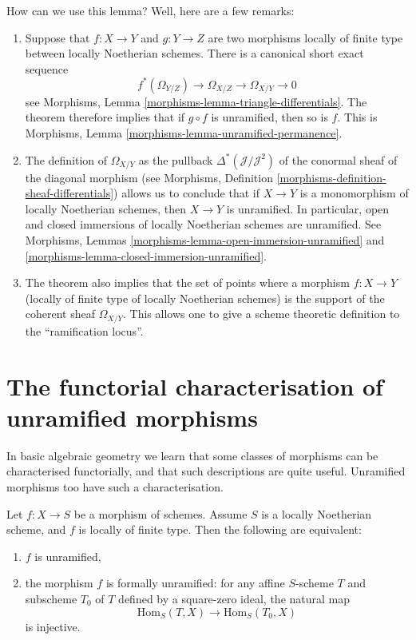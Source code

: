 \noindent
How can we use this lemma? Well, here are a few remarks:
\begin{enumerate}
\item Suppose that
$f : X \to Y$ and $g : Y \to Z$ are two morphisms locally of finite
type between locally Noetherian schemes. There is a canonical short
exact sequence
$$
f^*(\Omega_{Y/Z}) \to \Omega_{X/Z} \to \Omega_{X/Y} \to 0
$$
see Morphisms, Lemma \ref{morphisms-lemma-triangle-differentials}.
The theorem therefore implies that if $g \circ f$ is unramified,
then so is $f$. This is
Morphisms, Lemma \ref{morphisms-lemma-unramified-permanence}.
\item The definition of $\Omega_{X/Y}$ as the pullback
$\Delta^*(\mathcal{J}/\mathcal{J}^2)$ of the conormal sheaf
of the diagonal morphism (see
Morphisms, Definition \ref{morphisms-definition-sheaf-differentials})
allows us to conclude that if $X \to Y$ is a monomorphism of
locally Noetherian schemes, then $X \to Y$ is unramified.
In particular, open and closed immersions of locally Noetherian schemes
are unramified. See
Morphisms, Lemmas \ref{morphisms-lemma-open-immersion-unramified}
and
\ref{morphisms-lemma-closed-immersion-unramified}.
\item The theorem also implies that the set of points
where a morphism $f : X \to Y$ (locally of finite type of locally Noetherian
schemes) is the support of the coherent sheaf $\Omega_{X/Y}$.
This allows one to give a scheme theoretic definition to the
``ramification locus''.
\end{enumerate}

\section{The functorial characterisation of unramified morphisms}
\label{section-functorial-unramified}

\noindent
In basic algebraic geometry we learn that some classes of morphisms can be
characterised functorially, and that such descriptions are quite useful.
Unramified morphisms too have such a characterisation.

\begin{theorem}
\label{theorem-formally-unramified}
Let $f : X \to S$ be a morphism of schemes.
Assume $S$ is a locally Noetherian scheme, and $f$ is locally of finite type.
Then the following are equivalent:
\begin{enumerate}
\item $f$ is unramified,
\item the morphism $f$ is formally unramified:
for any affine $S$-scheme $T$ and subscheme $T_0$ of $T$
defined by a square-zero ideal,
the natural map
$$
\text{Hom}_S(T, X) \longrightarrow \text{Hom}_S(T_0, X)
$$
is injective.
\end{enumerate}
\end{theorem}


